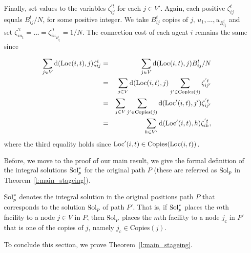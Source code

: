 \begin{proof2}
Finally, set values to the variables $\zeta_{ij}^{'t}$ for each $j \in V'$. Again, each 
positive $\zeta_{ij}^t$ equals
$B_{ij}^t/N$, for some positive integer. We take $B_{ij}^t$ copies of $j$, 
$u_1,\ldots,u_{B_{ij}^t}$ and
set $\zeta_{iu_1}^{'t} = \ldots = \zeta_{iu_{B_{ij}^t}}^{'t} = 1/N$. The connection cost of 
each agent $i$ remains the same since 

\begin{eqnarray*}
\sum_{j \in V} \mathrm{d}(\mathrm{Loc}(i,t),j)\zeta_{ij}^t &=&
\sum_{j \in V} \mathrm{d}(\mathrm{Loc}(i,t),j)B_{ij}^t/N\\
&=&
\sum_{j \in V} \mathrm{d}(\mathrm{Loc}(i,t),j)\sum_{j' \in \text{Copies}(j)}\zeta_{i j'}^{'t}\\
&=&
\sum_{j \in V} \sum_{j' \in \text{Copies}(j)}
\mathrm{d}(\mathrm{Loc}'(i,t),j') \zeta_{i j'}^{'t}\\
&=&
\sum_{h \in V'} \mathrm{d}(\mathrm{Loc}'(i,t),h) \zeta_{i h}^{'t},\\
\end{eqnarray*}
where the third equality holds since $\mathrm{Loc}'(i,t) \in \text{Copies}(\mathrm{Loc}(i,t))$.
\end{proof2}







    

\medskip

\noindent
Before, we move to the proof of our main result, we give the formal definition of the integral solutions $\mathrm{Sol}_p^*$ for the original path $P$ (these are referred as $\mathrm{Sol}_p$ in Theorem~\ref{l:main_stageing}).

\begin{definition}\label{d:Integral_original}
$\mathrm{Sol}_p^*$ denotes the integral solution in the original positions path $P$ that corresponds to the solution $\mathrm{Sol}_p$ of path $P'$. That is, if $\mathrm{Sol}_p^*$ places the $m$th facility to a node $j \in V$ in $P$, then $\mathrm{Sol}_p$ places the $m$th facility to a node $j_c$ in $P'$ that is one of the copies of $j$, namely $j_c \in \mathrm{Copies}(j)$.

\end{definition}
To conclude this section, we prove Theorem~\ref{l:main_stageing}.

